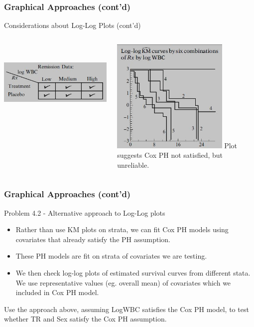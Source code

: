 \documentclass{beamer}
\theoremstyle{definition}
\begin{document}
\begin{frame}
\frametitle{Graphical Approaches (cont'd)}
\begin{block}{Considerations about Log-Log Plots (cont'd)}
\begin{columns}
    \begin{column}{0.48\textwidth}
        \includegraphics[width =\textwidth, height=4cm]{CH4_loglogMC.JPG}
    \end{column}
    \hspace{-10pt}
    \begin{column}{0.48\textwidth}
         \includegraphics[width =\textwidth, height=5.5cm]{Ch4_loglog6.JPG}
          Plot suggests Cox PH not satisfied, but unreliable.
    \end{column}
\end{columns}
\end{block}
\end{frame}

\begin{frame}
\frametitle{Graphical Approaches (cont'd)}
\begin{block}{Problem 4.2 - Alternative approach to Log-Log plots}
\begin{itemize}
\item Rather than use KM plots on strata, we can fit Cox PH models using covariates that already satisfy the PH assumption.
\item These PH models are fit on strata of covariates we are testing.
\item We then check log-log plots of estimated survival curves from different stata.  We use representative values (eg. overall mean) of covariates which we included in Cox PH model.
\end{itemize}
Use the approach above, assuming LogWBC satisfies the Cox PH model, to test whether TR and Sex satisfy the Cox PH assumption.
\end{block}
\end{frame}
\end{document}
